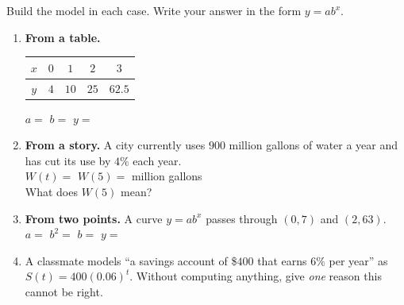 \documentclass[10pt]{article}
\begin{document}
\begin{practicebox}
Build the model in each case. Write your answer in the form $y=ab^{x}$.
\begin{enumerate}[leftmargin=1.7em, itemsep=6pt]
  \item \textbf{From a table.}
    \begin{center}
    \renewcommand{\arraystretch}{1.25}
    \begin{tabular}{|c|c|c|c|c|}
    \hline
    $x$ & $0$ & $1$ & $2$ & $3$ \\ \hline
    $y$ & $4$ & $10$ & $25$ & $62.5$ \\ \hline
    \end{tabular}
    \end{center}
    $a=$ \blank{1.4cm} \quad $b=$ \blank{1.4cm} \quad $y=$ \blank{3.0cm}

  \item \textbf{From a story.} A city currently uses $900$ million gallons of water a year and has
        cut its use by $4\%$ each year. \\[3pt]
        $W(t)=$ \blank{3.4cm} \quad $W(5)=$ \blank{2.6cm} million gallons \\[3pt]
        What does $W(5)$ mean? \writeline

  \item \textbf{From two points.} A curve $y=ab^{x}$ passes through $(0,7)$ and $(2,63)$. \\[3pt]
        $a=$ \blank{1.4cm} \quad $b^{2}=$ \blank{1.4cm} \quad $b=$ \blank{1.4cm} \quad
        $y=$ \blank{2.8cm}

  \item A classmate models ``a savings account of \$$400$ that earns $6\%$ per year'' as
        $S(t)=400(0.06)^{t}$. Without computing anything, give \emph{one} reason this cannot be
        right. \writeline
\end{enumerate}
\end{practicebox}
\end{document}
